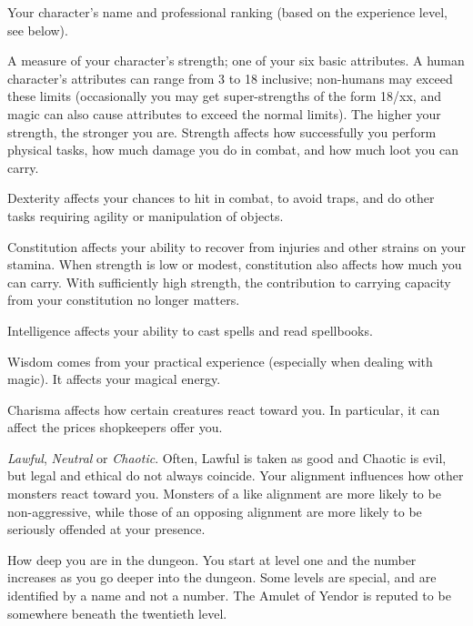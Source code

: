 \blist{}
\item[\bb{Rank}]
Your character's name and professional ranking (based on the
experience level, see below).
\item[\bb{Strength}]
A measure of your character's strength; one of your six basic
attributes.  A human character's attributes can range from 3 to 18 inclusive;
non-humans may exceed these limits
(occasionally you may get super-strengths of the form 18/xx, and magic can
also cause attributes to exceed the normal limits).  The
higher your strength, the stronger you are.  Strength affects how
successfully you perform physical tasks, how much damage you do in
combat, and how much loot you can carry.
\item[\bb{Dexterity}]
Dexterity affects your chances to hit in combat, to avoid traps, and
do other tasks requiring agility or manipulation of objects.
\item[\bb{Constitution}]
Constitution affects your ability to recover from injuries and other
strains on your stamina.
When strength is low or modest, constitution also affects how much you
can carry.  With sufficiently high strength, the contribution to
carrying capacity from your constitution no longer matters.
\item[\bb{Intelligence}]
Intelligence affects your ability to cast spells and read spellbooks.
\item[\bb{Wisdom}]
Wisdom comes from your practical experience (especially when dealing with
magic).  It affects your magical energy.
\item[\bb{Charisma}]
Charisma affects how certain creatures react toward you.  In
particular, it can affect the prices shopkeepers offer you.
\item[\bb{Alignment}]
%
{\it Lawful}, {\it Neutral\/} or {\it Chaotic}.  Often, Lawful is
taken as good and Chaotic is evil, but legal and ethical do not always
coincide.  Your alignment influences how other
monsters react toward you.  Monsters of a like alignment are more likely
to be non-aggressive, while those of an opposing alignment are more likely
to be seriously offended at your presence.
\item[\bb{Dungeon Level}]
How deep you are in the dungeon.  You start at level one and the number
increases as you go deeper into the dungeon.  Some levels are special,
and are identified by a name and not a number.  The Amulet of Yendor is
reputed to be somewhere beneath the twentieth level.
\item[\bb{Gold}]
